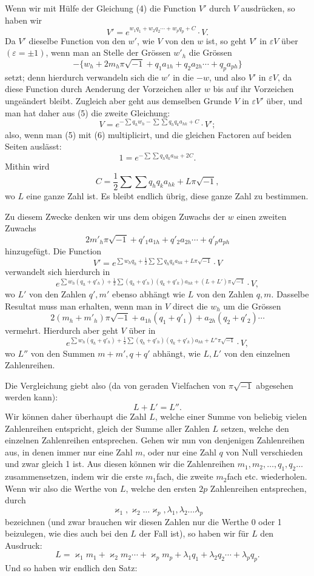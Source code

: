 \documentclass[10pt]{article}
\begin{document}
Wenn wir mit Hülfe der Gleichung (4) die Function \(V'\) durch \(V\) ausdrücken, so haben wir
\[
\tag{5}V'=e^{w_1q_1+w_2q_2\cdots+w_pq_p+C}\cdot V.
\]
Da \(V'\) dieselbe Function von den \(w'\), wie \(V\) von den \(w\) ist, so geht \(V'\) in \(\varepsilon V\) über \((\varepsilon=\pm1)\), wenn man an Stelle der Grössen \(w'_h\) die Grössen
\[
-\{w_h+2m_h\pi\sqrt{-1}+q_1a_{1h}+q_2a_{2h}\cdots+q_pa_{ph}\}
\]
setzt; denn hierdurch verwandeln sich die \(w'\) in die \(-w\), und also \(V'\) in \(\varepsilon V\), da diese Function durch Aenderung der Vorzeichen aller \(w\) bis auf ihr Vorzeichen ungeändert bleibt. Zugleich aber geht aus demselben Grunde \(V\) in \(\varepsilon V'\) über, und man hat daher aus (5) die zweite Gleichung:
\[
\tag{6}V=e^{-\sum q_hw_h-\sum\sum q_hq_ka_{hk}+C}\cdot V';
\]
also, wenn man (5) mit (6) multiplicirt, und die gleichen Factoren auf beiden Seiten auslässt:
\[
1=e^{-\sum\sum q_hq_ka_{hk}+2C}.
\]
Mithin wird
\[
\tag{7}C=\frac12\sum\sum q_hq_ka_{hk}+L\pi\sqrt{-1},
\]
wo \(L\) eine ganze Zahl ist. Es bleibt endlich übrig, diese ganze Zahl zu bestimmen.

Zu diesem Zwecke denken wir uns dem obigen Zuwachs der \(w\) einen zweiten Zuwachs
\[
2m'_h\pi\sqrt{-1}+q'_1a_{1h}+q'_2a_{2h}\cdots+q'_pa_{ph}
\]
hinzugefügt. Die Function
\[
V'=e^{\sum w_hq_h+\frac12\sum\sum q_hq_ka_{hk}+L\pi\sqrt{-1}}\cdot V
\]
verwandelt sich hierdurch in
\[
e^{\sum w_h(q_h+q'_h)+\frac12\sum(q_h+q'_h)(q_k+q'_k)a_{hk}+(L+L')\pi\sqrt{-1}}\cdot V,
\]
wo \(L'\) von den Zahlen \(q',m'\) ebenso abhängt wie \(L\) von den Zahlen \(q,m\). Dasselbe Resultat muss man erhalten, wenn man in \(V\) direct die \(w_h\) um die Grössen
\[
2(m_h+m'_h)\pi\sqrt{-1}+a_{1h}(q_1+q'_1)+a_{2h}(q_2+q'_2)\cdots
\]
vermehrt. Hierdurch aber geht \(V\) über in
\[
e^{\sum w_h(q_h+q'_h)+\frac12\sum(q_h+q'_h)(q_k+q'_k)a_{hk}+L''\pi\sqrt{-1}}\cdot V,
\]
wo \(L''\) von den Summen \(m+m',q+q'\) abhängt, wie \(L,L'\) von den einzelnen Zahlenreihen.

Die Vergleichung giebt also (da von geraden Vielfachen von \(\pi\sqrt{-1}\) abgesehen werden kann):
\[
L+L'=L''.
\]
Wir können daher überhaupt die Zahl \(L\), welche einer Summe von beliebig vielen Zahlenreihen entspricht, gleich der Summe aller Zahlen \(L\) setzen, welche den einzelnen Zahlenreihen entsprechen. Gehen wir nun von denjenigen Zahlenreihen aus, in denen immer nur eine Zahl \(m\), oder nur eine Zahl \(q\) von Null verschieden und zwar gleich 1 ist. Aus diesen können wir die Zahlenreihen \(m_1,m_2,\ldots,q_1,q_2\ldots\) zusammensetzen, indem wir die erste \(m_1\)fach, die zweite \(m_2\)fach etc. wiederholen. Wenn wir also die Werthe von \(L\), welche den ersten \(2p\) Zahlenreihen entsprechen, durch
\[
\varkappa_1,\varkappa_2\ldots\varkappa_p,\lambda_1,\lambda_2\ldots\lambda_p
\]
bezeichnen (und zwar brauchen wir diesen Zahlen nur die Werthe 0 oder 1 beizulegen, wie dies auch bei den \(L\) der Fall ist), so haben wir für \(L\) den Ausdruck:
\[
L=\varkappa_1m_1+\varkappa_2m_2\cdots+\varkappa_pm_p+\lambda_1q_1+\lambda_2q_2\cdots+\lambda_pq_p.
\]
Und so haben wir endlich den Satz:
\end{document}
